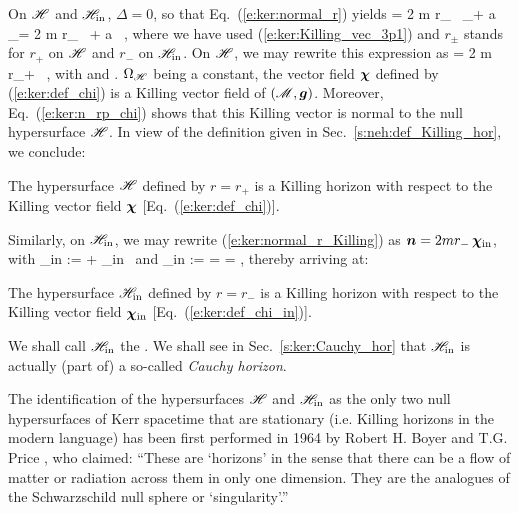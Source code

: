 On $\mathscr{H}$ and $\mathscr{H}_{\rm in}$, $\Delta=0$, so that
Eq.~(\ref{e:ker:normal_r})
yields
\be \label{e:ker:normal_r_Killing}
     = 2 m r_{\pm} \, \wpar_\ti + a \, \wpar_\tph = 2 m r_{\pm} \, \w{\xi}
        + a \, \w{\eta} ,
\ee
where we have used (\ref{e:ker:Killing_vec_3p1}) and $r_{\pm}$ stands for
$r_+$ on $\mathscr{H}$ and $r_-$ on $\mathscr{H}_{\rm in}$.
On $\mathscr{H}$, we may rewrite this expression as
\be \label{e:ker:n_rp_chi}
     = 2 m r_+ \, \w{\chi} ,
\ee
with
\be \label{e:ker:def_chi}
    \encadre{\w{\chi} := \w{\xi} + \Omega_{\Hor} \, \w{\eta} }
\ee
and
\be \label{e:ker:def_OmegaH}
    .
\ee
$\Omega_{\mathscr{H}}$ being a constant, the vector field $\bm{\chi}$ defined by
(\ref{e:ker:def_chi}) is a Killing vector field of $(\mathscr{M},\bm{g})$.
Moreover, Eq.~(\ref{e:ker:n_rp_chi})
shows that this Killing vector is normal to the null hypersurface $\mathscr{H}$.
In view of the definition given in Sec.~\ref{s:neh:def_Killing_hor}, we
conclude:
\begin{prop}
\label{p:ker:H_Killing}
The hypersurface $\mathscr{H}$ defined by $r=r_+$ is a Killing horizon with respect to the Killing vector field $\bm{\chi}$
[Eq.~(\ref{e:ker:def_chi})].
\end{prop}

Similarly, on $\mathscr{H}_{\rm in}$, we may rewrite (\ref{e:ker:normal_r_Killing})
as $\bm{n} = 2 m r_- \, \bm{\chi}_{\rm in}$, with
\be \label{e:ker:def_chi_in}
    \w{\chi}_{\rm in} := \w{\xi} + \Omega_{\rm in} \, \w{\eta}
\ee
and
\be \label{e:ker:def_Omega_in}
    \Omega_{\rm in} :=  = 
        =  ,
\ee
thereby arriving at:
\begin{prop}
The hypersurface $\mathscr{H}_{\rm in}$ defined by $r=r_-$ is a Killing horizon with respect to the Killing vector field $\bm{\chi}_{\rm in}$
[Eq.~(\ref{e:ker:def_chi_in})].
\end{prop}
We shall call $\mathscr{H}_{\rm in}$ the . We shall see in Sec.~\ref{s:ker:Cauchy_hor} that $\mathscr{H}_{\rm in}$
is actually (part of) a so-called \emph{Cauchy horizon}.

\begin{hist}
The identification of the hypersurfaces $\mathscr{H}$ and $\mathscr{H}_{\rm in}$
as the only two null hypersurfaces of Kerr spacetime that are stationary
(i.e. Killing horizons in the modern language) has been first performed in
1964 by Robert H. Boyer
and T.G. Price \cite{BoyerP65}, who claimed: ``These are `horizons'
in the sense that there can be a flow of matter or radiation across them in only one dimension. They are the analogues of the Schwarzschild null sphere or `singularity'.''
\end{hist}

